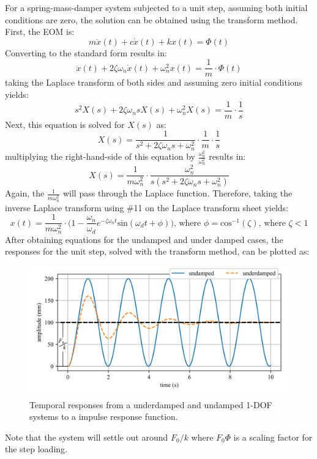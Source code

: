 \documentclass[12pt,letter]{article}
\numberwithin{ex}{section} %
\numberwithin{re}{section} %
\begin{document}
For a spring-mass-damper system subjected to a unit step, assuming both initial conditions are zero, the solution can be obtained using the transform method. First, the EOM is:
\begin{equation}
m\ddot{x}(t) + c\dot{x}(t) + kx(t) = \Phi(t)
\end{equation}
Converting to the standard form results in:
\begin{equation}
\ddot{x}(t) + 2  \zeta \omega_n\dot{x}(t) + \omega_n^2x(t) = \frac{1}{m} \cdot \Phi(t)
\end{equation}
taking the Laplace transform of both sides and assuming zero initial conditions yields:
\begin{equation}
	s^2X(s) + 2  \zeta \omega_n s X(s) + \omega_n^2 X(s)  =\frac{1}{m} \cdot \frac{1}{s}
\end{equation}
Next, this equation is solved for $X(s)$ as:
\begin{equation}
	X(s) = \frac{1}{s^2 + 2  \zeta \omega_n s + \omega_n^2} \cdot \frac{1}{m} \cdot \frac{1}{s}
\end{equation}
multiplying the right-hand-side of this equation by  $\frac{\omega_n^2}{\omega_n^2}$ results in:
\begin{equation}
	X(s) = \frac{1}{m \omega_n^2} \cdot \frac{\omega_n^2}{s(s^2+2\zeta\omega_n s+\omega_n^2)}
\end{equation}
Again, the $\frac{1}{m\omega_n^2}$ will pass through the Laplace function. Therefore, taking the inverse Laplace transform using \#11 on the Laplace transform sheet yields:
\begin{equation}
	x(t) = \frac{1}{m \omega_n^2} \cdot \Big(1 - \frac{\omega_n}{\omega_d}e^{-\zeta \omega_n t}\text{sin}(\omega_dt + \phi)\Big)\text{, where } \phi = \text{cos}^{-1}(\zeta)\text{, where } \zeta<1
\end{equation}
After obtaining equations for the undamped and under damped cases, the responses for the unit step, solved with the transform method, can be plotted as:
\begin{figure}[H]
	\centering
	\includegraphics[]{../Figures/response_unit_step.png}
	\caption{Temporal responses from a underdamped and undamped 1-DOF systems to a impulse response function.}
\end{figure}
Note that the system will settle out around $F_0/k$ where $F_0  \Phi$ is a scaling factor for the step loading.
\end{document}
